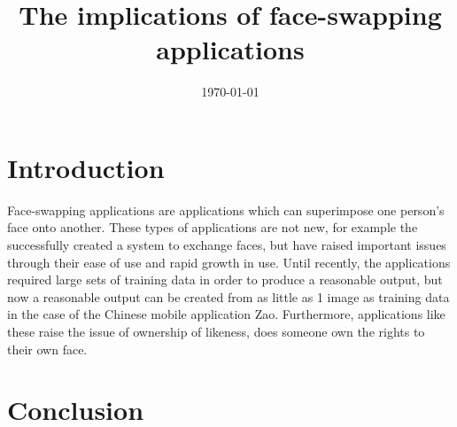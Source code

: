 \documentclass[a4paper, 11pt]{article}
\begin{document}
\title{The implications of face-swapping applications}
\date{\today}
\maketitle

\section{Introduction}
Face-swapping applications are applications which can superimpose one person's face onto another.
These types of applications are not new, for example the \cite{blanz04} successfully created a system to exchange faces, but have raised important issues through their ease of use and rapid growth in use.
Until recently, the applications required large sets of training data in order to produce a reasonable output, but now a reasonable output can be created from as little as 1 image as training data in the case of the Chinese mobile application Zao.
Furthermore, applications like these raise the issue of ownership of likeness, does someone own the rights to their own face.

\section{Conclusion}


\end{document}
